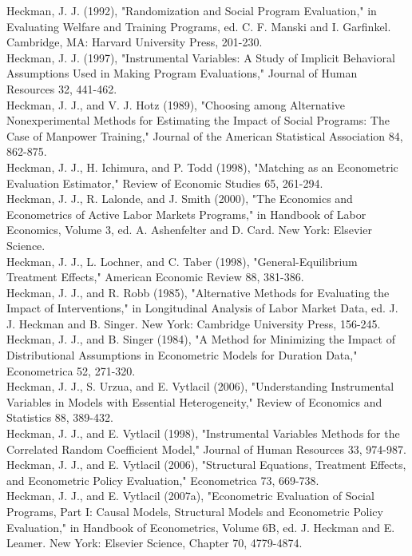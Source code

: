 \documentclass[10pt]{article}
\begin{document}
Heckman, J. J. (1992), "Randomization and Social Program Evaluation," in Evaluating Welfare and Training Programs, ed. C. F. Manski and I. Garfinkel. Cambridge, MA: Harvard University Press, 201-230.\\
Heckman, J. J. (1997), "Instrumental Variables: A Study of Implicit Behavioral Assumptions Used in Making Program Evaluations," Journal of Human Resources 32, 441-462.\\
Heckman, J. J., and V. J. Hotz (1989), "Choosing among Alternative Nonexperimental Methods for Estimating the Impact of Social Programs: The Case of Manpower Training," Journal of the American Statistical Association 84, 862-875.\\
Heckman, J. J., H. Ichimura, and P. Todd (1998), "Matching as an Econometric Evaluation Estimator," Review of Economic Studies 65, 261-294.\\
Heckman, J. J., R. Lalonde, and J. Smith (2000), "The Economics and Econometrics of Active Labor Markets Programs," in Handbook of Labor Economics, Volume 3, ed. A. Ashenfelter and D. Card. New York: Elsevier Science.\\
Heckman, J. J., L. Lochner, and C. Taber (1998), "General-Equilibrium Treatment Effects," American Economic Review 88, 381-386.\\
Heckman, J. J., and R. Robb (1985), "Alternative Methods for Evaluating the Impact of Interventions," in Longitudinal Analysis of Labor Market Data, ed. J. J. Heckman and B. Singer. New York: Cambridge University Press, 156-245.\\
Heckman, J. J., and B. Singer (1984), "A Method for Minimizing the Impact of Distributional Assumptions in Econometric Models for Duration Data," Econometrica 52, 271-320.\\
Heckman, J. J., S. Urzua, and E. Vytlacil (2006), "Understanding Instrumental Variables in Models with Essential Heterogeneity," Review of Economics and Statistics 88, 389-432.\\
Heckman, J. J., and E. Vytlacil (1998), "Instrumental Variables Methods for the Correlated Random Coefficient Model," Journal of Human Resources 33, 974-987.\\
Heckman, J. J., and E. Vytlacil (2006), "Structural Equations, Treatment Effects, and Econometric Policy Evaluation," Econometrica 73, 669-738.\\
Heckman, J. J., and E. Vytlacil (2007a), "Econometric Evaluation of Social Programs, Part I: Causal Models, Structural Models and Econometric Policy Evaluation," in Handbook of Econometrics, Volume 6B, ed. J. Heckman and E. Leamer. New York: Elsevier Science, Chapter 70, 4779-4874.\\
\end{document}
